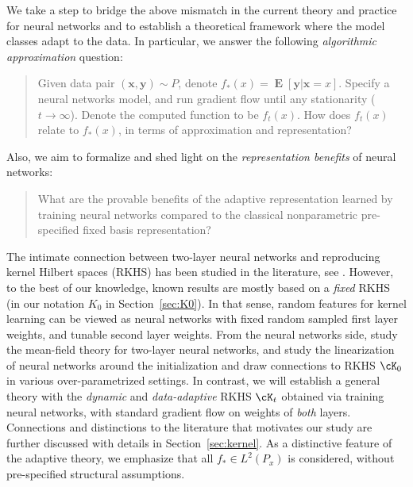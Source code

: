 \documentclass[11pt]{article}
\numberwithin{equation}{section}
\def\E{\mathop{\mathbf{E}}}
\def\bd#1{\mathbf{#1}}
\def\bx{\bd{x}}
\def\by{\bd{y}}
\begin{document}
We take a step to bridge the above mismatch in the current theory and practice for neural networks and to establish a theoretical framework where the model classes adapt to the data. In particular, we answer the following \textit{algorithmic approximation} question:

\begin{quote}
    Given data pair $(\bx, \by) \sim P$, denote $f_*(x) = \E[\by | \bx = x]$. Specify a neural networks model, and run gradient flow until any stationarity ($t \rightarrow \infty$). Denote the computed function to be $f_t(x)$. How does $f_t(x)$ relate to $f_*(x)$, in terms of approximation and representation?
\end{quote}

Also, we aim to formalize and shed light on the \textit{representation benefits} of neural networks:

\begin{quote}
    What are the provable benefits of the adaptive representation learned by training neural networks compared to the classical nonparametric pre-specified fixed basis representation?
\end{quote}



The intimate connection between two-layer neural networks and reproducing kernel Hilbert spaces (RKHS) has been studied in the literature, see \cite{rahimi2008random, cho2009kernel, daniely2016toward, bach2017breaking, jacot2018neural}. However, to the best of our knowledge, known results are mostly based on a \textit{fixed} RKHS (in our notation $K_0$ in Section~\ref{sec:K0}). In that sense, random features for kernel learning \citep{rahimi2008random, rahimi2009weighted, rudi2017generalization} can be viewed as neural networks with fixed random sampled first layer weights, and tunable second layer weights. From the neural networks side, \cite{rotskoff2018neural, mei2018mean, sirignano2019mean} study the mean-field theory for two-layer neural networks, and \cite{jacot2018neural, du2018gradient,chizat2018note, ghorbani2019linearized} study the linearization of neural networks around the initialization and draw connections to RKHS $\cK_0$ in various over-parametrized settings. In contrast, we will establish a general theory with the \textit{dynamic} and \textit{data-adaptive} RKHS $\cK_t$ obtained via training neural networks, with standard gradient flow on weights of \textit{both} layers. Connections and distinctions to the literature that motivates our study are further discussed with details in Section~\ref{sec:kernel}. As a distinctive feature of the adaptive theory, we emphasize that all $f_* \in L^2(P_x)$ is considered, without pre-specified structural assumptions.
\end{document}
